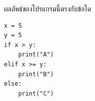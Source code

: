 ﻿%
\question ผลลัพธ์ของโปรแกรมนี้ตรงกับข้อใด
\begin{verbatim}
x = 5
y = 5
if x > y:
    print("A")
elif x >= y:
    print("B")
else:
    print("C")
\end{verbatim}
